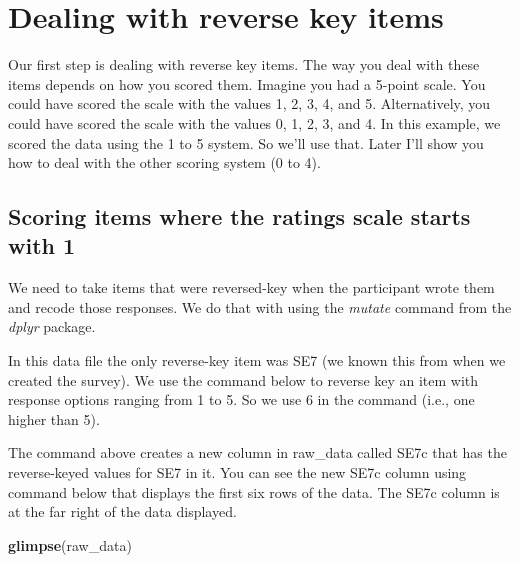 \documentclass[
]{krantz}
\makeatletter
\newenvironment{Shaded}{\begin{snugshade}}{\end{snugshade}}
\newcommand{\DataTypeTok}[1]{\textcolor[rgb]{0.27,0.27,0.27}{#1}}
\newcommand{\DecValTok}[1]{\textcolor[rgb]{0.06,0.06,0.06}{#1}}
\newcommand{\KeywordTok}[1]{\textcolor[rgb]{0.27,0.27,0.27}{\textbf{#1}}}
\newcommand{\NormalTok}[1]{#1}
\newcommand{\OperatorTok}[1]{\textcolor[rgb]{0.43,0.43,0.43}{\textbf{#1}}}
\newcommand{\StringTok}[1]{\textcolor[rgb]{0.5,0.5,0.5}{#1}}
\newenvironment{kframe}{%
\medskip{}
\setlength{\fboxsep}{.8em}
 \def\at@end@of@kframe{}%
 \ifinner\ifhmode%
  \def\at@end@of@kframe{\end{minipage}}%
  \begin{minipage}{\columnwidth}%
 \fi\fi%
 \def\FrameCommand##1{\hskip\@totalleftmargin \hskip-\fboxsep
 \colorbox{shadecolor}{##1}\hskip-\fboxsep
     \hskip-\linewidth \hskip-\@totalleftmargin \hskip\columnwidth}%
 \MakeFramed {\advance\hsize-\width
   \@totalleftmargin\z@ \linewidth\hsize
   \@setminipage}}%
 {\par\unskip\endMakeFramed%
 \at@end@of@kframe}
\renewenvironment{Shaded}{\begin{kframe}}{\end{kframe}}
\makeatother
\begin{document}
\hypertarget{dealing-with-reverse-key-items}{%
\section{Dealing with reverse key items}\label{dealing-with-reverse-key-items}}

Our first step is dealing with reverse key items. The way you deal with these items depends on how you scored them. Imagine you had a 5-point scale. You could have scored the scale with the values 1, 2, 3, 4, and 5. Alternatively, you could have scored the scale with the values 0, 1, 2, 3, and 4. In this example, we scored the data using the 1 to 5 system. So we'll use that. Later I'll show you how to deal with the other scoring system (0 to 4).

\hypertarget{scoring-items-where-the-ratings-scale-starts-with-1}{%
\subsection{Scoring items where the ratings scale starts with 1}\label{scoring-items-where-the-ratings-scale-starts-with-1}}

We need to take items that were reversed-key when the participant wrote them and recode those responses. We do that with using the \emph{mutate} command from the \emph{dplyr} package.

In this data file the only reverse-key item was SE7 (we known this from when we created the survey). We use the command below to reverse key an item with response options ranging from 1 to 5. So we use 6 in the command (i.e., one higher than 5).

\begin{Shaded}
\end{Shaded}

The command above creates a new column in raw\_data called SE7c that has the reverse-keyed values for SE7 in it. You can see the new SE7c column using command below that displays the first six rows of the data. The SE7c column is at the far right of the data displayed.

\begin{Shaded}
\begin{Highlighting}[]
\KeywordTok{glimpse}\NormalTok{(raw_data)}
\end{Highlighting}
\end{Shaded}
\end{document}
